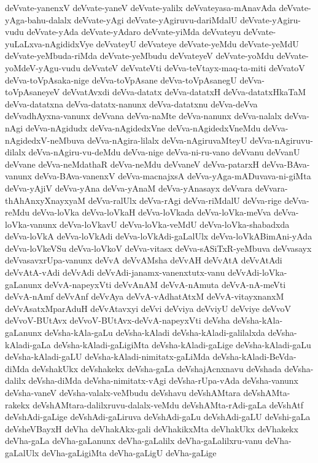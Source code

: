 {deVvate-yanenxV
deVvate-yaneV
deVvate-yalilx
deVvateyasa-mAnavAda
deVvate-yAga-bahu-dalalx
deVvate-yAgi
deVvate-yAgiruvu-dariMdalU
deVvate-yAgiru-vudu
deVvate-yAda
deVvate-yAdaro
deVvate-yiMda
deVvateyu
deVvate-yuLaLxva-nAgididxVye
deVvateyU
deVvateye
deVvate-yeMdu
deVvate-yeMdU
deVvate-yeMbuda-riMda
deVvate-yeMbudu
deVvateyeV
deVvate-yoMdu
deVvate-yoMdeV-yAgu-vudu
deVvateV
deVvateVti
deVva-teVtayx-maq-ta-miti
deVvatoV
deVva-toVpAsaka-nige
deVva-toVpAsane
deVva-toVpAsanegU
deVva-toVpAsaneyeV
deVvatAvxdi
deVva-datatx
deVva-datatxH
deVva-datatxHkaTaM
deVva-datatxna
deVva-datatx-nanunx
deVva-datatxnu
deVva-deVva
deVvadhAyxna-vanunx
deVvana
deVva-naMte
deVva-nanunx
deVva-nalalx
deVva-nAgi
deVva-nAgidudx
deVva-nAgidedxVne
deVva-nAgidedxVneMdu
deVva-nAgidedxV-neMbuva
deVva-nAgira-lilalx
deVva-nAgiruvaMteyU
deVva-nAgiruvu-dilalx
deVva-nAgiru-vu-deMdu
deVva-nige
deVva-ni-ru-vano
deVvanu
deVvanU
deVvane
deVva-neMdathaR
deVva-neMdu
deVvaneV
deVva-patarxH
deVva-BAva-vanunx
deVva-BAva-vanenxV
deVva-macnajxsA
deVva-yAga-mADuvava-ni-giMta
deVva-yAjiV
deVva-yAna
deVva-yAnaM
deVva-yAnasayx
deVvara
deVvara-thAhAnxyXnayxyaM
deVva-ralUlx
deVva-rAgi
deVva-riMdalU
deVva-rige
deVva-reMdu
deVva-loVka
deVva-loVkaH
deVva-loVkada
deVva-loVka-meVva
deVva-loVka-vanunx
deVva-loVkavU
deVva-loVka-veMdU
deVva-loVka-shabadxda
deVva-loVkA
deVva-loVkAdi
deVva-loVkAdi-gaLalUlx
deVva-loVkABimAni-yAda
deVva-loVkeVSu
deVva-loVkoV
deVva-vitasx
deVva-sASiTxR-yeMbuva
deVvasayx
deVvasavxrUpa-vanunx
deVvA
deVvAMsha
deVvAH
deVvAtA
deVvAtAdi
deVvAtA-vAdi
deVvAdi
deVvAdi-janamx-vanenxtutx-vanu
deVvAdi-loVka-gaLanunx
deVvA-napeyxVti
deVvAnAM
deVvA-nAmuta
deVvA-nA-meVti
deVvA-nAmf
deVvAnf
deVvAya
deVvA-vAdhatAtxM
deVvA-vitayxnanxM
deVvAsatxMparAduH
deVvAtavxyi
deVvi
deVviya
deVviyU
deVviye
deVvoV
deVvoV-BUtAvx
deVvoV-BUtAvx-deVvA-napeyxVti
deVsha
deVsha-kAla-gaLanunx
deVsha-kAla-gaLu
deVsha-kAladi
deVsha-kAladi-galilalxda
deVsha-kAladi-gaLa
deVsha-kAladi-gaLigiMta
deVsha-kAladi-gaLige
deVsha-kAladi-gaLu
deVsha-kAladi-gaLU
deVsha-kAladi-nimitatx-gaLiMda
deVsha-kAladi-BeVda-diMda
deVshakUkx
deVshakekx
deVsha-gaLa
deVshajAcnxnavu
deVshada
deVsha-dalilx
deVsha-diMda
deVsha-nimitatx-vAgi
deVsha-rUpa-vAda
deVsha-vanunx
deVsha-vaneV
deVsha-valalx-veMbudu
deVshavu
deVshAMtara
deVshAMta-rakekx
deVshAMtara-dalilxruvu-dalalx-veMdu
deVshAMta-rAdi-gaLa
deVshAtf
deVshAdi-gaLige
deVshAdi-gaLiruva
deVshAdi-gaLu
deVshAdi-gaLU
deVshi-gaLa
deVsheVBayxH
deVha
deVhakAkx-gali
deVhakikxMta
deVhakUkx
deVhakekx
deVha-gaLa
deVha-gaLanunx
deVha-gaLalilx
deVha-gaLalilxru-vanu
deVha-gaLalUlx
deVha-gaLigiMta
deVha-gaLigU
deVha-gaLige
}
